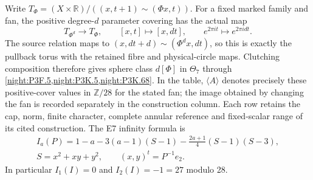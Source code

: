Write
\(T_\Phi=(X\times\mathbb R)/((x,t+1)\sim(\Phi x,t))\).
For a fixed marked family and fan, the positive degree-\(d\)
parameter covering has the actual map
\[
 T_{\Phi^d}\longrightarrow T_\Phi,
 \qquad [x,t]\longmapsto[x,dt],
 \qquad e^{2\pi it}\longmapsto e^{2\pi idt}.
\]
The source relation maps to
\((x,dt+d)\sim(\Phi^d x,dt)\), so this is exactly the
pullback torus with the retained fibre and physical-circle maps.
Clutching composition therefore gives sphere class \(d[\Phi]\)
in \(\Theta_7\) through \cref{night:P3F.5,night:P3K.5,night:P3K.68}.
In the table, \(\langle A\rangle\) denotes precisely these
positive-cover values in \(\mathbb Z/28\) for the stated fan;
the image obtained by changing the fan is recorded separately
in the construction column. Each row retains the cap, norm,
finite character, complete annular reference and fixed-scalar
range of its cited construction. The E7 infinity formula is
\[
 \begin{gathered}
 I_a(P)=1-a-3(a-1)(S-1)
       -\frac{2a+1}{4}(S-1)(S-3),\\
 S=x^2+xy+y^2,\qquad (x,y)^t=P^{-1}e_2.
 \end{gathered}
\]
In particular \(I_1(I)=0\) and \(I_2(I)=-1=27\) modulo 28.

